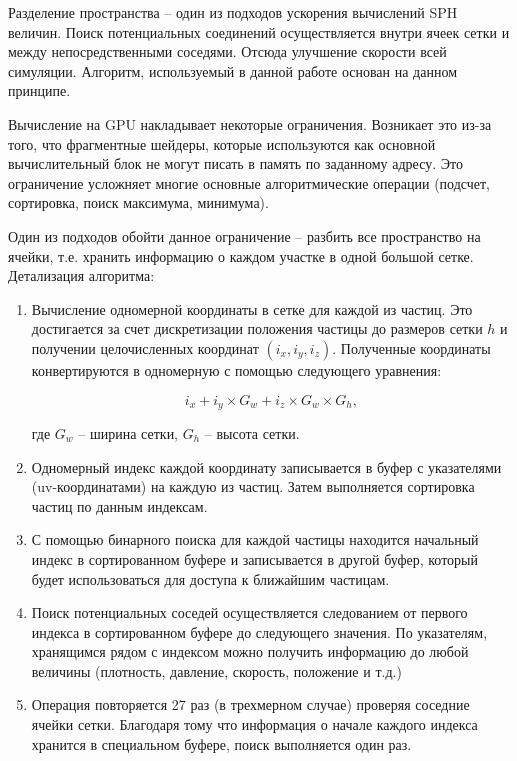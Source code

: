 Разделение пространства -- один из подходов ускорения вычислений SPH величин.
Поиск потенциальных соединений осуществляется внутри ячеек сетки и между непосредственными 
соседями. Отсюда улучшение скорости всей симуляции. Алгоритм, используемый в данной работе
основан на данном принципе. 

Вычисление на GPU накладывает некоторые ограничения. Возникает это из-за того, что 
фрагментные шейдеры, которые используются как основной вычислительный блок не могут
писать в память по заданному адресу. Это ограничение усложняет многие основные
алгоритмические операции (подсчет, сортировка, поиск максимума, минимума).  

Один из подходов обойти данное ограничение -- разбить все пространство на ячейки, т.е.
хранить информацию о каждом участке в одной большой сетке.  \\

Детализация алгоритма:

\begin{enumerate}
  \item Вычисление одномерной координаты в сетке для каждой из частиц. Это достигается за счет
    дискретизации положения частицы до размеров сетки $h$ и получении целочисленных координат
    $(i_x, i_y, i_z)$. Полученные координаты конвертируются в одномерную с помощью следующего
    уравнения:

    \begin{equation}
    \label{eq:}
      i_x + i_y \times G_w + i_z \times G_w \times G_h,
    \end{equation}

    где $G_w$ -- ширина сетки, $G_h$ -- высота сетки.

  \item Одномерный индекс каждой координату записывается в буфер с указателями (uv-координатами)
    на каждую из частиц. Затем выполняется сортировка частиц по данным индексам.

  \item С помощью бинарного поиска для каждой частицы находится начальный индекс в сортированном
    буфере и записывается в другой буфер, который будет использоваться для доступа к ближайшим
    частицам.

  \item Поиск потенциальных соседей осуществляется следованием от первого индекса в сортированном
    буфере до следующего значения. По указателям, хранящимся рядом с индексом можно получить 
    информацию до любой величины (плотность, давление, скорость, положение и т.д.)

  \item Операция повторяется 27 раз (в трехмерном случае) проверяя соседние ячейки сетки.
    Благодаря тому что информация о начале каждого индекса хранится в специальном буфере,
    поиск выполняется один раз.

\end{enumerate}

